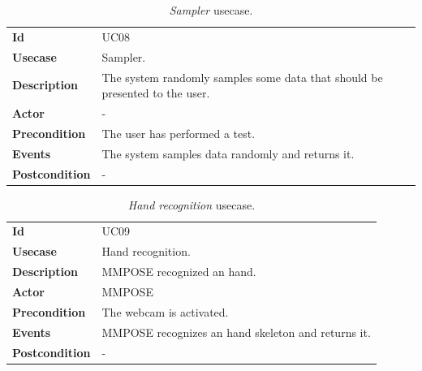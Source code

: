 \begin{table}[h!t]
    \centering
    \caption{\emph{Sampler} usecase.}
    \label{tab:uc:sampler}
    \centering
    \begin{tabular}{l | p{80mm}}
        \textbf{Id}            & UC08                                                                        \\
        \textbf{Usecase}       & Sampler.                                                                    \\
        \textbf{Description}   & The system randomly samples some data that should be presented to the user. \\
        \textbf{Actor}         & -                                                                           \\
        \textbf{Precondition}  & The user has performed a test.                                              \\
        \textbf{Events}        & The system samples data randomly and returns it.                            \\
        \textbf{Postcondition} & -
    \end{tabular}
\end{table}

\begin{table}[h!t]
    \centering
    \caption{\emph{Hand recognition} usecase.}
    \label{tab:uc:hand}
    \centering
    \begin{tabular}{l | p{80mm}}
        \textbf{Id}            & UC09                                               \\
        \textbf{Usecase}       & Hand recognition.                                  \\
        \textbf{Description}   & MMPOSE recognized an hand.                         \\
        \textbf{Actor}         & MMPOSE                                             \\
        \textbf{Precondition}  & The webcam is activated.                           \\
        \textbf{Events}        & MMPOSE recognizes an hand skeleton and returns it. \\
        \textbf{Postcondition} & -
    \end{tabular}
\end{table}

